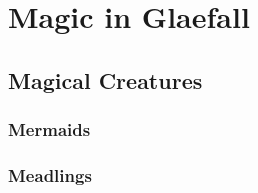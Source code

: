 \chapter{Magic in Glaefall}

\section{Magical Creatures}

\subsection{Mermaids}

\subsection{Meadlings}